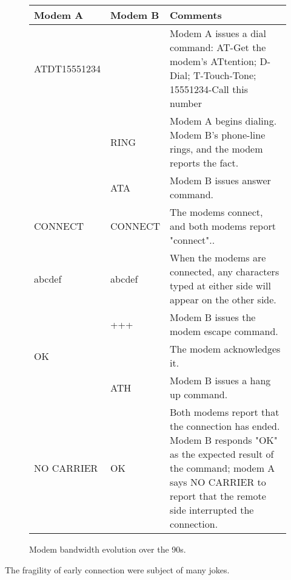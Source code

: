 \par
 \begin{figure}[H]
\centering  
\begin{tabularx}{\textwidth}{ L{0.2} L{0.15} L{0.65}}
  \toprule
  \textbf{Modem A} & \textbf{Modem B} & \textbf{Comments} \\
  \toprule 
   
    ATDT15551234 &	&	Modem A issues a dial command: AT-Get the modem's ATtention; D-Dial; T-Touch-Tone; 15551234-Call this number\\
    \toprule 
      & RING	& Modem A begins dialing. Modem B's phone-line rings, and the modem reports the fact.\\
      \toprule 
    & ATA	& Modem B issues answer command.\\
    \toprule 
    CONNECT	& CONNECT	& The modems connect, and both modems report "connect"..\\
    abcdef	& abcdef	& When the modems are connected, any characters typed at either side will appear on the other side.\\
    \toprule 
    & +++	& Modem B issues the modem escape command.\\
    \toprule 
     OK &	& The modem acknowledges it.\\
    \toprule 
    & ATH	& Modem B issues a hang up command.\\
    \toprule 
    NO CARRIER &	OK	& Both modems report that the connection has ended. Modem B responds "OK" as the expected result of the command; modem A says NO CARRIER to report that the remote side interrupted the connection.\\
   \toprule
\end{tabularx}
\caption{Modem bandwidth evolution over the 90s.}
\end{figure}
\par
The fragility of early connection were subject of many jokes.\\

\par
{}